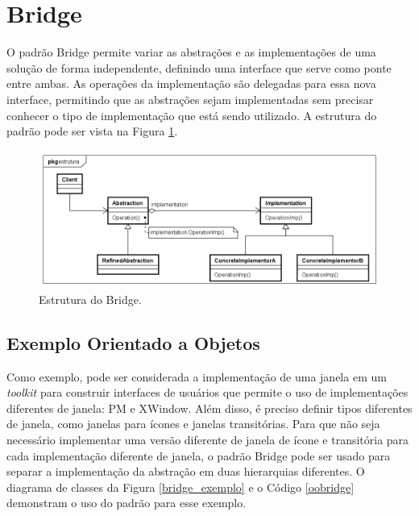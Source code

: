 \section{Bridge}

O padrão Bridge permite variar as abstrações e as 
implementações de uma solução de forma independente, 
definindo uma interface que serve como ponte entre ambas. 
As operações da implementação são delegadas para essa 
nova interface, permitindo que as abstrações sejam 
implementadas sem precisar conhecer o tipo de 
implementação que está sendo utilizado. A estrutura do 
padrão pode ser vista na Figura \ref{bridge_struct}.\cite{gamma:1995}

\begin{figure}[htb]
	\caption{\label{bridge_struct}Estrutura do Bridge.}
	\begin{center}
	    \includegraphics[scale=0.5]{5_padroes-contexto-funcional/5.2_estruturais/5.2.2_bridge/bridge_estrutura.png}
	\end{center}
\end{figure}

\subsection*{Exemplo Orientado a Objetos}

Como exemplo, pode ser considerada a implementação de 
uma janela em um \textit{toolkit} para construir interfaces 
de usuários que permite o uso de implementações diferentes 
de janela: PM e XWindow. Além disso, é preciso definir tipos 
diferentes de janela, como janelas para ícones e janelas 
transitórias. Para que não seja necessário implementar 
uma versão diferente de janela de ícone e transitória 
para cada implementação diferente de janela, o padrão 
Bridge pode ser usado para separar a implementação 
da abstração em duas hierarquias diferentes. O diagrama 
de classes da Figura \ref{bridge_exemplo} e o Código 
\ref{oobridge} demonstram o uso do padrão para esse 
exemplo.

